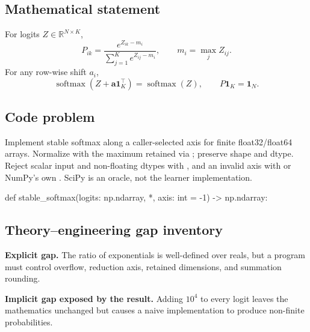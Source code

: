 
        \subsection{Mathematical statement}


For logits $Z\in\mathbb R^{N\times K}$,
\[
  P_{ik}=\frac{e^{Z_{ik}-m_i}}{\sum_{j=1}^{K}e^{Z_{ij}-m_i}},
  \qquad m_i=\max_jZ_{ij}.
\]
For any row-wise shift $a_i$,
\[
  \operatorname{softmax}(Z+\bm a\bm 1_K^\top)
  =\operatorname{softmax}(Z),\qquad
  P\bm 1_K=\bm 1_N.
\]


        \subsection{Code problem}


Implement stable softmax along a caller-selected axis for finite float32/float64
arrays.  Normalize with the maximum retained via ; preserve
shape and dtype.  Reject scalar input and non-floating dtypes with
, and an invalid axis with  or NumPy's own
.  SciPy is an oracle,
not the learner implementation.


        \begin{contractbox}
        \begin{Code}
        def stable_softmax(logits: np.ndarray, *, axis: int = -1) -> np.ndarray:
        \end{Code}
        \end{contractbox}

        \subsection{Theory--engineering gap inventory}

        \begin{gapbox}
        \textbf{Explicit gap.} The ratio of exponentials is well-defined over reals, but a program must control overflow, reduction axis, retained dimensions, and summation rounding.

        \textbf{Implicit gap exposed by the result.} Adding $10^4$ to every logit leaves the mathematics unchanged but causes a naive implementation to produce non-finite probabilities.
        \end{gapbox}

